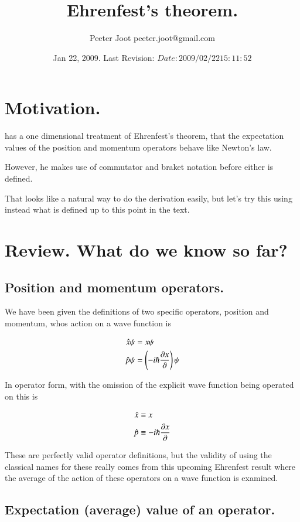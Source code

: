 \documentclass{article}
\title{ Ehrenfest's theorem. }
\author{Peeter Joot \quad peeter.joot@gmail.com}
\date{ Jan 22, 2009.  Last Revision: $Date: 2009/02/22 15:11:52 $ }
\begin{document}
\maketitle{}

\tableofcontents
\section{ Motivation. }

\cite{mcmahon2005qmd} has a one dimensional treatment of Ehrenfest's theorem,
that the expectation values of the position and momentum operators behave
like Newton's law.

However, he makes use
of commutator and braket notation before either is defined.

That looks like a natural way to do the derivation easily, but let's try
this using instead what is defined up to this point in the text.

\section{ Review.  What do we know so far? }

\subsection{ Position and momentum operators. }

We have been given the definitions of two specific operators, position and momentum, 
whos action on a wave function is

\begin{align*}
\hat{x} \psi &= x \psi \\
\hat{p} \psi &= \left(-i \hbar \frac{\partial{x}}{\partial {}}\right) \psi
\end{align*}

In operator form, with the omission of the explicit wave function being operated on this is

\begin{align*}
\hat{x} &\equiv x  \\
\hat{p} &\equiv -i \hbar \frac{\partial{x}}{\partial {}}
\end{align*}

These are perfectly valid operator definitions, but the validity of using the 
classical names for these really comes from this upcoming Ehrenfest result where
the average of the action of these operators on a wave function is examined.

\subsection{ Expectation (average) value of an operator. }
\end{document}
